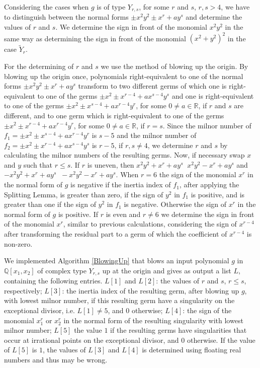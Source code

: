 \documentclass[noend]{amsproc}
\DeclareMathOperator{\requiv}{\overset{r}{\sim}}
\begin{document}
Considering the cases when $g$ is of type $Y_{r,s}$, for some $r$ and $s$,
$r,s>4$, we have to distinguish between the normal forms $\pm x^2y^2\pm
x^r+ay^s$ and determine the values of $r$ and $s$.  We determine the sign in
front of the monomial $x^2y^2$ in the same way as determining the sign in front
of the monomial $(x^2+y^2)^2$ in the case $\widetilde Y_r$.

For the determining of $r$ and $s$ we use the method of blowing up the origin.
By blowing up the origin once, polynomials right-equivalent to one of the
normal forms $\pm x^2y^2\pm x^r+ay^s$ transform to two different germs of which
one is right-equivalent to one of the germs $\pm x^2\pm x^{r-4}+ax^{s-4}y^s$
and one is right-equivalent to one of the germs  $\pm x^2\pm
x^{s-4}+ax^{r-4}y^r$, for some $0\neq a\in \mathbb R$, if $r$ and $s$ are
different, and to one germ which is right-equivalent to one of the germs $\pm
x^2\pm x^{r-4}+ax^{r-4}y^r$, for some $0\neq a\in\mathbb R$, if  $r=s$. Since
the milnor number of $f_1=\pm x^2\pm x^{s-4}+ax^{r-4}y^r$ is $s-5$ and the
milnor number of $f_2=\pm x^2\pm x^{r-4}+ax^{s-4}y^s$  is $r-5$, if $r,s\neq
4$, we determine $r$ and $s$ by calculating the milnor numbers of the resulting
germs. Now, if necessary swap $x$ and $y$ such that $r\le s$. If $r$ is uneven,
then $x^2y^2+x^{r}+ay^s\requiv x^2y^2- x^{r}+ay^s$ and
$-x^2y^2+x^{r}+ay^s\requiv -x^2y^2- x^{r}+ay^s$. When $r=6$ the sign of the
monomial $x^r$ in the normal form of $g$ is negative if the inertia index of
$f_1$, after applying the Splitting Lemma, is greater than zero, if the sign of
$y^2$ in $f_1$ is positive, and is greater than one if the sign of $y^2$ in
$f_1$ is negative. Otherwise the sign of $x^r$ in the normal form of $g$ is
positive. If $r$ is even and $r\neq 6$ we determine the sign in front of the
monomial $x^r$, similar to previous calculations, considering the sign of $x^{r-4}$
after transforming the residual part to a germ of which the coefficient of $x^{r-4}$ is non-zero.

We implemented Algorithm \ref{BlowingUp} that blows an input polynomial $g$ in
$\mathbb Q[x_1,x_2]$ of complex type $Y_{r,s}$ up at the origin and gives as
output a list $L$, containing the following entries. $L[1]$ and $L[2]$: the
values of $r$ and $s$, $r\le s$, respectively; $L[3]$: the inertia index of the
resulting germ, after blowing up $g$, with lowest milnor number, if this
resulting germ have a singularity on the exceptional divisor, i.e. $L[1]\neq
5$, and $0$ otherwise; $L[4]$: the sign of the monomial $x_1^r$ or $x_2^r$ in
the normal form of the resulting singularity with lowest milnor number; $L[5]$
the value $1$ if the resulting germs have singularities that occur at
irrational points on the exceptional divisor, and $0$ otherwise. If the value
of $L[5]$ is $1$, the values of $L[3]$ and $L[4]$ is determined using floating
real numbers and thus may be wrong.
\end{document}
